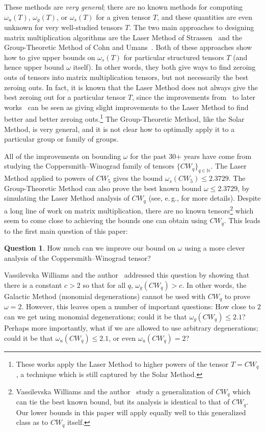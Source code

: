 \documentclass[11pt]{article}
\numberwithin{equation}{section}
\theoremstyle{definition}
\newtheorem{question}[theorem]{Question}
\theoremstyle{plain}
\newcommand{\N}{\mathbb N}
\newcommand{\eg}{e.\,g.}
\theoremstyle{definition}
\begin{document}
These methods are \emph{very general}; there are no known methods for computing $\omega_u(T)$, $\omega_g(T)$, or $\omega_s(T)$ for a given tensor $T$, and these quantities are even unknown for very well-studied tensors $T$. The two main approaches to designing matrix multiplication algorithms are the Laser Method of Strassen~\cite{strassenlaser1} and the Group-Theoretic Method of Cohn and Umans~\cite{cohn2003group}. Both of these approaches show how to give upper bounds on $\omega_s(T)$ for particular structured tensors $T$ (and hence upper bound $\omega$ itself). In other words, they both give ways to find zeroing outs of tensors into matrix multiplication tensors, but not necessarily the best zeroing outs. In fact, it is known that the Laser Method does not always give the best zeroing out for a particular tensor $T$, since the improvements from~\cite{coppersmith} to 
%
later works~\cite{stothers,v12,legall,awrefined} 
can be seen as giving slight improvements to the Laser Method to find better and better zeroing outs.\footnote{These works apply the Laser Method to higher powers of the tensor $T = CW_q$, a technique which is still captured by the Solar Method.} The Group-Theoretic Method, like the Solar Method, is very general, and it is not clear how to optimally apply it to a particular group or family of groups.

All of the improvements on bounding $\omega$ for the past 30+ years have come from studying the Coppersmith--Winograd family of tensors $\{CW_q\}_{q \in \N}$. The Laser Method applied to powers of $CW_5$ gives the bound $\omega_s(CW_5) \leq 2.3729$. The Group-Theoretic Method can also prove the best known bound $\omega \leq 2.3729$, by simulating the Laser Method analysis of $CW_q$ (see, \eg, \cite{almanitcs} for more details). Despite a long line of work on matrix multiplication, there are no known tensors\footnote{
%
Vassilevska Williams and the author~\cite{aw} %
study a generalization of $CW_q$ which can tie the best known bound, but its analysis is identical to that of $CW_q$. Our lower bounds in this paper will apply equally well to this generalized class as to $CW_q$ itself.} which seem to come close to achieving the bounds one can obtain using $CW_q$. This leads to the first main question of this paper: 
\begin{question}\label{q1}
How much can we improve our bound on $\omega$ using a more clever analysis of the Coppersmith--Winograd tensor?
\end{question}

%
Vassilevska Williams and the author~\cite{aw} %
addressed this question by showing that there is a constant $c>2$ so that for all $q$, $\omega_g(CW_q) > c$. In other words, the Galactic Method (monomial degenerations) cannot be used with $CW_q$ to prove $\omega=2$. However, this leaves open a number of important questions: How close to $2$ can we get using monomial degenerations; could it be that $\omega_g(CW_q) \leq 2.1$? Perhaps more importantly, what if we are allowed to use arbitrary degenerations; could it be that $\omega_u(CW_q) \leq 2.1$, or even $\omega_u(CW_q) = 2$?
\end{document}
